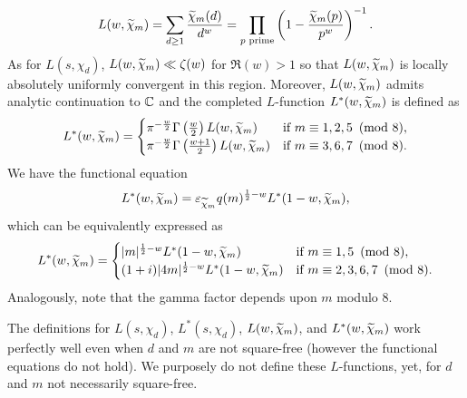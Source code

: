 \documentclass[12pt,reqno,oneside]{amsart}
\begin{document}
    \[
        L(w,\widetilde{\chi}_{m}) = \sum_{d \ge 1}\frac{\widetilde{\chi}_{m}(d)}{d^{w}} = \prod_{p \text{ prime}}\left(1-\frac{\widetilde{\chi}_{m}(p)}{p^{w}}\right)^{-1}.
    \]
    As for $L(s,\chi_{d})$, $L(w,\widetilde{\chi}_{m}) \ll \zeta(w)$ for $\Re(w) > 1$ so that $L(w,\widetilde{\chi}_{m})$ is locally absolutely uniformly convergent in this region. Moreover, $L(w,\widetilde{\chi}_{m})$ admits analytic continuation to $\mathbb{C}$ and the completed $L$-function $L^{\ast}(w,\widetilde{\chi}_{m})$ is defined as
    \[
        L^{\ast}(w,\widetilde{\chi}_{m}) = \begin{cases} \pi^{-\frac{w}{2}}\Gamma\left(\frac{w}{2}\right)L(w,\widetilde{\chi}_{m}) & \text{if $m \equiv 1,2,5 \ \left(\text{mod }8\right)$}, \\ \pi^{-\frac{w}{2}}\Gamma\left(\frac{w+1}{2}\right)L(w,\widetilde{\chi}_{m}) & \text{if $m \equiv 3,6,7 \ \left(\text{mod }8\right)$}. \end{cases}
    \]
    We have the functional equation
    \[
        L^{\ast}(w,\widetilde{\chi}_{m}) = \varepsilon_{\widetilde{\chi}_{m}}q(m)^{\frac{1}{2}-w}L^{\ast}(1-w,\widetilde{\chi}_{m}),
    \]
    which can be equivalently expressed as
    \[
        L^{\ast}(w,\widetilde{\chi}_{m}) = \begin{cases} |m|^{\frac{1}{2}-w}L^{\ast}(1-w,\widetilde{\chi}_{m}) & \text{if $m \equiv 1,5 \ \left(\text{mod }8\right)$}, \\ (1+i)|4m|^{\frac{1}{2}-w}L^{\ast}(1-w,\widetilde{\chi}_{m}) & \text{if $m \equiv 2,3,6,7 \ \left(\text{mod }8\right)$}. \end{cases}
    \]
    Analogously, note that the gamma factor depends upon $m$ modulo $8$.

    \begin{remark}
        The definitions for $L(s,\chi_{d})$, $L^{\ast}(s,\chi_{d})$, $L(w,\widetilde{\chi}_{m})$, and $L^{\ast}(w,\widetilde{\chi}_{m})$ work perfectly well even when $d$ and $m$ are not square-free (however the functional equations do not hold). We purposely do not define these $L$-functions, yet, for $d$ and $m$ not necessarily square-free.
    \end{remark}
\end{document}
